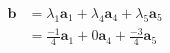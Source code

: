 \documentclass[preview]{standalone}
\renewcommand{\vec}{\mathbf}
\begin{document}
\begin{center}
\begin{align*}\vec{b}&=\lambda_1\vec{a}_1+\lambda_4\vec{a}_4+\lambda_5\vec{a}_5\\&=\frac{-1}{4}\vec{a}_1+0\vec{a}_4+\frac{-3}{4}\vec{a}_5\end{align*}
\end{center}
\end{document}
